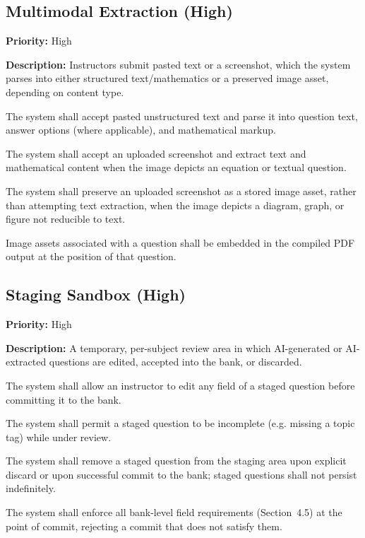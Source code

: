 \documentclass[11pt]{article}
\newcommand{\priority}[1]{\textbf{Priority:} #1}
\newcommand{\reqid}[1]{\textbf{#1}}
\begin{document}
\subsection{Multimodal Extraction (High)}
\priority{High}

\textbf{Description:} Instructors submit pasted text or a screenshot, which
the system parses into either structured text/mathematics or a preserved
image asset, depending on content type.

\begin{description}[nosep,leftmargin=2.2cm]
  \item[\reqid{REQ-3.1}] The system shall accept pasted unstructured text
    and parse it into question text, answer options (where applicable), and
    mathematical markup.
  \item[\reqid{REQ-3.2}] The system shall accept an uploaded screenshot and
    extract text and mathematical content when the image depicts an
    equation or textual question.
  \item[\reqid{REQ-3.3}] The system shall preserve an uploaded screenshot as
    a stored image asset, rather than attempting text extraction, when the
    image depicts a diagram, graph, or figure not reducible to text.
  \item[\reqid{REQ-3.4}] Image assets associated with a question shall be
    embedded in the compiled PDF output at the position of that question.
\end{description}

\subsection{Staging Sandbox (High)}
\priority{High}

\textbf{Description:} A temporary, per-subject review area in which
AI-generated or AI-extracted questions are edited, accepted into the bank,
or discarded.

\begin{description}[nosep,leftmargin=2.2cm]
  \item[\reqid{REQ-4.1}] The system shall allow an instructor to edit any
    field of a staged question before committing it to the bank.
  \item[\reqid{REQ-4.2}] The system shall permit a staged question to be
    incomplete (e.g. missing a topic tag) while under review.
  \item[\reqid{REQ-4.3}] The system shall remove a staged question from the
    staging area upon explicit discard or upon successful commit to the
    bank; staged questions shall not persist indefinitely.
  \item[\reqid{REQ-4.4}] The system shall enforce all bank-level field
    requirements (Section~4.5) at the point of commit, rejecting a commit
    that does not satisfy them.
\end{description}
\end{document}
